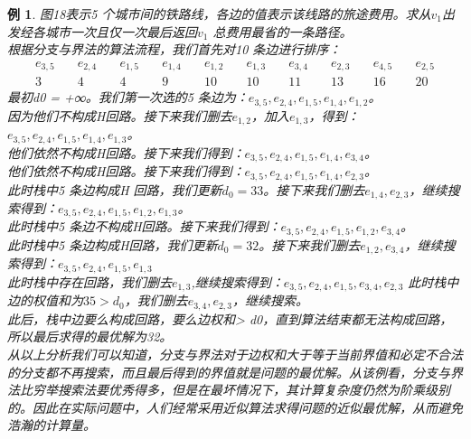 \documentclass[11pt,a4paper,openany]{book}
\newtheorem{sample}{\textbf{例}}[section]
\begin{document}
\begin{sample}
图18表示5 个城市间的铁路线，各边的值表示该线路的旅途费用。求从$v_1$出发经各城市一次且仅一次最后返回$v_1$ 总费用最省的一条路径。\\
\noindent 根据分支与界法的算法流程，我们首先对10 条边进行排序：\\
\begin{align*}
  e_{3,5} & \quad e_{2,4}& \quad e_{1,5}&\quad e_{1,4}&\quad e_{1,2}&\quad e_{1,3}&\quad e_{3,4}&\quad e_{2,3}&\quad e_{4,5}&\quad e_{2,5}\\
  3 & \quad 4& \quad 4& \quad 9& \quad 10& \quad 10& \quad 11& \quad 13& \quad 16& \quad 20
\end{align*}
\indent 最初d0 = +∞。我们第一次选的5 条边为：$e_{3,5},e_{2,4},e_{1,5},e_{1,4},e_{1,2}$。\\
\indent 因为他们不构成H回路。接下来我们删去$e_{1,2}$，加入$e_{1,3}$，得到：$e_{3,5},e_{2,4},e_{1,5},e_{1,4},e_{1,3}$。\\
\indent 他们依然不构成H回路。接下来我们得到：$e_{3,5},e_{2,4},e_{1,5},e_{1,4},e_{3,4}$。\\
\indent 他们依然不构成H回路。接下来我们得到：$e_{3,5},e_{2,4},e_{1,5},e_{1,4},e_{2,3}$。\\
\indent 此时栈中5 条边构成H 回路，我们更新$d_0 = 33$。接下来我们删去$e_{1,4},e_{2,3}$，继续搜索得到：$e_{3,5},e_{2,4},e_{1,5},e_{1,2},e_{1,3}$。\\
\indent 此时栈中5 条边不构成H回路。接下来我们得到：$e_{3,5},e_{2,4},e_{1,5},e_{1,2},e_{3,4}$。\\
\indent 此时栈中5 条边构成H回路，我们更新$d_0 = 32$。接下来我们删去$e_{1,2},e_{3,4}$，继续搜索得到：$e_{3,5},e_{2,4},e_{1,5},e_{1,3}$\\
\indent 此时栈中存在回路，我们删去$e_{1,3}$,继续搜索得到：$e_{3,5},e_{2,4},e_{1,5},e_{3,4},e_{2,3}$ 此时栈中边的权值和为$35>d_0$，我们删去$e_{3,4},e_{2,3}$，继续搜索。\\
\indent 此后，栈中边要么构成回路，要么边权和> d0，直到算法结束都无法构成回路，所以最后求得的最优解为32。\\
\indent 从以上分析我们可以知道，分支与界法对于边权和大于等于当前界值和必定不合法的分支都不再搜索，而且最后得到的界值就是问题的最优解。从该例看，分支与界法比穷举搜索法要优秀得多，但是在最坏情况下，其计算复杂度仍然为阶乘级别的。因此在实际问题中，人们经常采用近似算法求得问题的近似最优解，从而避免浩瀚的计算量。\\
\end{sample}
\end{document}
